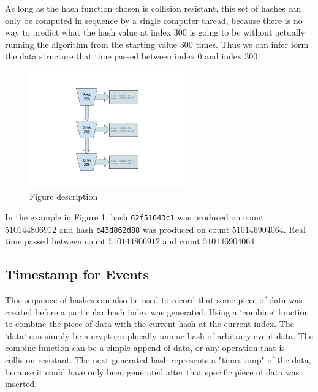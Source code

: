 \documentclass[12pt]{article}
\begin{document}
As long as the hash function chosen is collision resistant, this set of hashes can only be computed in sequence by a single computer thread, because there is no way to predict what the hash value at index $300$ is going to be without actually running the algorithm from the starting value $300$ times.  Thus we can infer form the data structure that time passed between index $0$ and index $300$.

\begin{figure}
  \begin{center}
    \centering
    \includegraphics[width=0.6\textwidth]{figures/fig_2.png}
    \caption[Fig 2]{Figure description \label{fig_2}}
  \end{center}
  \end{figure}

In the example in Figure 1, hash \texttt{62f51643c1} was produced on
count $510144806912$ and hash \texttt{c43d862d88} was produced on
count $510146904064$. Real time passed between count $510144806912$
and count $510146904064$.

\subsection{Timestamp for Events}

This sequence of hashes can also be used to record that some piece of data was created before a particular hash index was generated. Using a `combine` function to combine the piece of data with the current hash at the current index. The `data` can simply be a cryptographically unique hash of arbitrary event data. The combine function can be a simple append of data, or any operation that is collision resistant. The next generated hash represents a "timestamp" of the data, because it could have only been generated after that specific piece of data was inserted.\\
\end{document}
